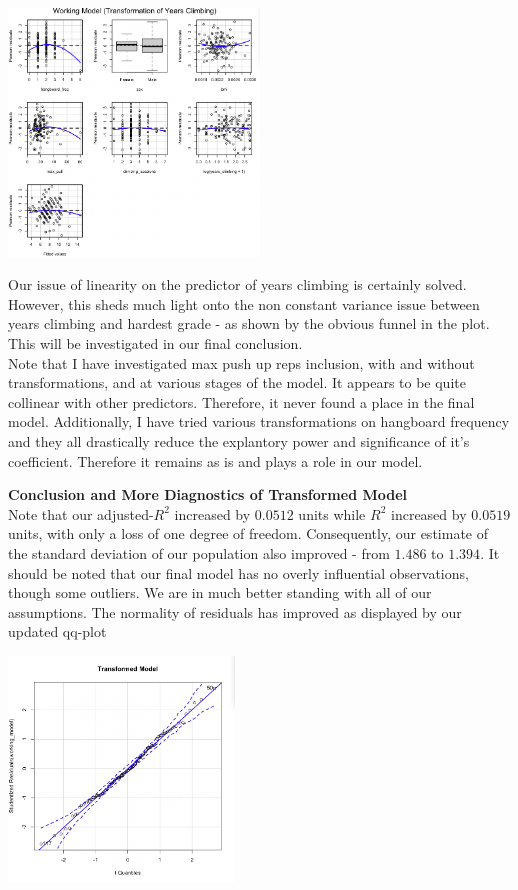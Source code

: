 \documentclass[11pt]{amsart}
\begin{document}
\begin{center}
\includegraphics[width=0.5\textwidth]{working_resid2}
\end{center}

Our issue of linearity on the predictor of years climbing is certainly solved.
However, this sheds much light onto the non constant variance issue between years climbing and hardest grade - as shown by the obvious funnel in the plot. This will be investigated in our final conclusion.\\

Note that I have investigated max push up reps inclusion, with and without transformations, and at various stages of the model. It appears to be quite collinear with other predictors.
Therefore, it never found a place in the final model.
Additionally, I have tried various transformations on hangboard frequency and they all drastically reduce the explantory power and significance of it's coefficient. Therefore it remains as is and plays a role in our model.

\newpage
{\bf\large Conclusion and More Diagnostics of Transformed Model}\\
Note that our adjusted-$R^2$ increased by $0.0512$ units while $R^2$ increased by $0.0519$ units, with only a loss of one degree of freedom.
Consequently, our estimate of the standard deviation of our population also improved - from $1.486$ to $1.394$.
It should be noted that our final model has no overly influential observations, though some outliers.
We are in much better standing with all of our assumptions.
The normality of residuals has improved as displayed by our updated qq-plot

\begin{center}
\includegraphics[width=0.45\textwidth]{final_qq}
\end{center}
\end{document}
